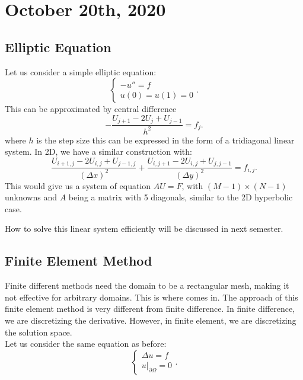 \documentclass[../main/main.tex]{subfiles}
\begin{document}
\section{October 20th, 2020}
\subsection{Elliptic Equation}
Let us consider a simple elliptic equation: \[
\begin{cases}
    -u'' = f \\
    u(0) = u(1) = 0
\end{cases}
.\] This can be approximated by central difference \[
- \frac{U_{j+1}-2U_{j} + U_{j-1}}{h^2} = f_j
.\] where $h$ is the step size this can be expressed in the form of a tridiagonal linear system. In 2D, we have a similar construction with: \[
\frac{U_{i+1,j}-2U_{i,j} + U_{j-1,j}}{(\Delta x)^2} + 
\frac{U_{i,j+1}-2U_{i,j} + U_{j,j-1}}{(\Delta y)^2} = f_{i,j}
.\] This would give us a system of equation $AU=F$, with $(M-1)\times (N-1)$ unknowns and $A$ being a matrix with 5 diagonals, similar to the 2D hyperbolic case.
\begin{remark}
    How to solve this linear system efficiently will be discussed in next semester.
\end{remark}
\subsection{Finite Element Method}
Finite different methods need the domain to be a rectangular mesh, making it not effective for arbitrary domains. This is where  comes in. The approach of this finite element method is very different from finite difference. In finite difference, we are discretizing the derivative. However, in finite element, we are discretizing the solution space. \\

Let us consider the same equation as before: \[
\begin{cases}
    \Delta u = f \\
u \big\rvert_{\partial \Omega} = 0
\end{cases}
.\] 
\end{document}
